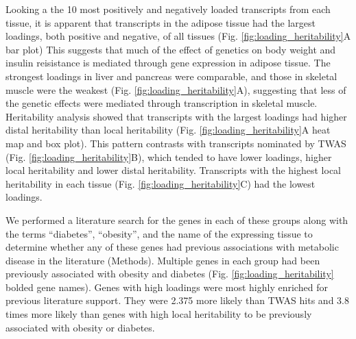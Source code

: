 \documentclass[
]{article}
\begin{document}
Looking a the 10 most positively and negatively loaded transcripts from
each tissue, it is apparent that transcripts in the adipose tissue had
the largest loadings, both positive and negative, of all tissues (Fig.
\ref{fig:loading_heritability}A bar plot) This suggests that much of the
effect of genetics on body weight and insulin reisistance is mediated
through gene expression in adipose tissue. The strongest loadings in
liver and pancreas were comparable, and those in skeletal muscle were
the weakest (Fig. \ref{fig:loading_heritability}A), suggesting that less
of the genetic effects were mediated through transcription in skeletal
muscle. Heritability analysis showed that transcripts with the largest
loadings had higher distal heritability than local heritability (Fig.
\ref{fig:loading_heritability}A heat map and box plot). This pattern
contrasts with transcripts nominated by TWAS (Fig.
\ref{fig:loading_heritability}B), which tended to have lower loadings,
higher local heritability and lower distal heritability. Transcripts
with the highest local heritability in each tissue (Fig.
\ref{fig:loading_heritability}C) had the lowest loadings.

We performed a literature search for the genes in each of these groups
along with the terms ``diabetes'', ``obesity'', and the name of the
expressing tissue to determine whether any of these genes had previous
associations with metabolic disease in the literature (Methods).
Multiple genes in each group had been previously associated with obesity
and diabetes (Fig. \ref{fig:loading_heritability} bolded gene names).
Genes with high loadings were most highly enriched for previous
literature support. They were 2.375 more likely than TWAS hits and 3.8
times more likely than genes with high local heritability to be
previously associated with obesity or diabetes.
\end{document}
